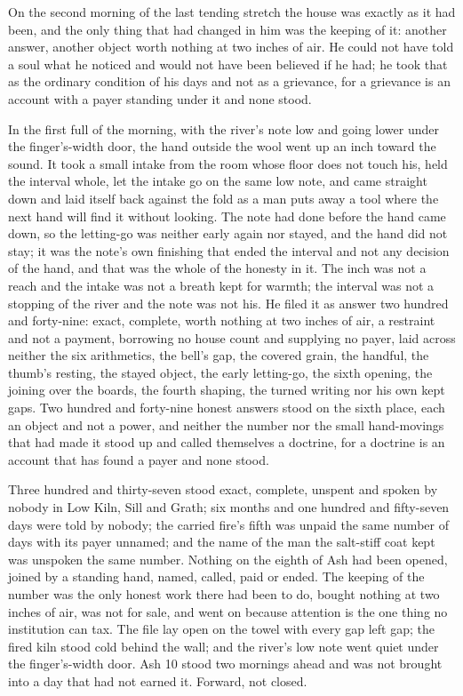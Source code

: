 On the second morning of the last tending stretch the house was exactly as it had been, and the only thing that had changed in him was the keeping of it: another answer, another object worth nothing at two inches of air. He could not have told a soul what he noticed and would not have been believed if he had; he took that as the ordinary condition of his days and not as a grievance, for a grievance is an account with a payer standing under it and none stood.

In the first full of the morning, with the river's note low and going lower under the finger's-width door, the hand outside the wool went up an inch toward the sound. It took a small intake from the room whose floor does not touch his, held the interval whole, let the intake go on the same low note, and came straight down and laid itself back against the fold as a man puts away a tool where the next hand will find it without looking. The note had done before the hand came down, so the letting-go was neither early again nor stayed, and the hand did not stay; it was the note's own finishing that ended the interval and not any decision of the hand, and that was the whole of the honesty in it. The inch was not a reach and the intake was not a breath kept for warmth; the interval was not a stopping of the river and the note was not his. He filed it as answer two hundred and forty-nine: exact, complete, worth nothing at two inches of air, a restraint and not a payment, borrowing no house count and supplying no payer, laid across neither the six arithmetics, the bell's gap, the covered grain, the handful, the thumb's resting, the stayed object, the early letting-go, the sixth opening, the joining over the boards, the fourth shaping, the turned writing nor his own kept gaps. Two hundred and forty-nine honest answers stood on the sixth place, each an object and not a power, and neither the number nor the small hand-movings that had made it stood up and called themselves a doctrine, for a doctrine is an account that has found a payer and none stood.

Three hundred and thirty-seven stood exact, complete, unspent and spoken by nobody in Low Kiln, Sill and Grath; six months and one hundred and fifty-seven days were told by nobody; the carried fire's fifth was unpaid the same number of days with its payer unnamed; and the name of the man the salt-stiff coat kept was unspoken the same number. Nothing on the eighth of Ash had been opened, joined by a standing hand, named, called, paid or ended. The keeping of the number was the only honest work there had been to do, bought nothing at two inches of air, was not for sale, and went on because attention is the one thing no institution can tax. The file lay open on the towel with every gap left gap; the fired kiln stood cold behind the wall; and the river's low note went quiet under the finger's-width door. Ash 10 stood two mornings ahead and was not brought into a day that had not earned it. Forward, not closed.
